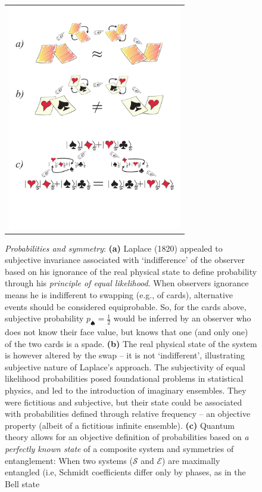 \documentclass[aps,rmp,epsfig,11pt]{revtex4}
\newcommand{\cS}        {{\mathcal S}}
\newcommand{\cE}        {{\mathcal E}}
\newcommand{\+}         {\dagger}
\begin{document}
\begin{figure}[htb]
\begin{tabular}{l}
\vspace{-0.15in} 
\includegraphics[width=3.0in]{allcards.pdf}\\
\end{tabular}
\caption{\footnotesize{\it Probabilities and symmetry}: 
{\bf (a)} Laplace (1820) appealed to subjective invariance associated with `indifference' of the observer based on his ignorance of the real physical state to define probability through his {\it principle of equal likelihood}. When observers ignorance means he is indifferent to swapping (e.g., of cards), alternative 
events should be considered equiprobable. So, for the cards above, subjective probability 
$p_\spadesuit ={ \frac 1 2}$ would be inferred by an observer who does not know their face value, 
but knows that one (and only one) of the two cards is a spade.
{\bf (b)} The real physical state of the system is however altered by the swap -- it is not `indifferent',
illustrating subjective nature of Laplace's approach. The subjectivity of equal likelihood probabilities 
posed foundational problems in statistical physics, and led to the introduction of imaginary ensembles. 
They were fictitious and  subjective, but their state could be associated with probabilities 
defined through relative frequency -- an objective property (albeit of a fictitious infinite ensemble).
{\bf (c)} Quantum theory allows for an objective definition of probabilities based on {\it a perfectly known state} of a composite system and symmetries of entanglement: When two systems ($\cS$ and $\cE$) 
are maximally entangled (i.e, Schmidt coefficients differ only by phases, as in the Bell state
}
\end{figure}
\end{document}
